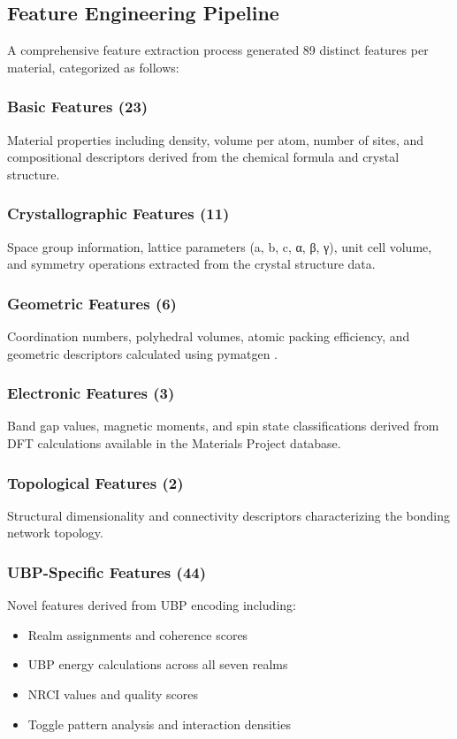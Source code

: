 \documentclass[12pt,a4paper]{article}
\begin{document}
\subsection{Feature Engineering Pipeline}

A comprehensive feature extraction process generated 89 distinct features per material, categorized as follows:

\subsubsection{Basic Features (23)}
Material properties including density, volume per atom, number of sites, and compositional descriptors derived from the chemical formula and crystal structure.

\subsubsection{Crystallographic Features (11)}
Space group information, lattice parameters (a, b, c, α, β, γ), unit cell volume, and symmetry operations extracted from the crystal structure data.

\subsubsection{Geometric Features (6)}
Coordination numbers, polyhedral volumes, atomic packing efficiency, and geometric descriptors calculated using pymatgen \cite{ong2013python}.

\subsubsection{Electronic Features (3)}
Band gap values, magnetic moments, and spin state classifications derived from DFT calculations available in the Materials Project database.

\subsubsection{Topological Features (2)}
Structural dimensionality and connectivity descriptors characterizing the bonding network topology.

\subsubsection{UBP-Specific Features (44)}
Novel features derived from UBP encoding including:
\begin{itemize}
    \item Realm assignments and coherence scores
    \item UBP energy calculations across all seven realms
    \item NRCI values and quality scores
    \item Toggle pattern analysis and interaction densities
\end{itemize}
\end{document}
